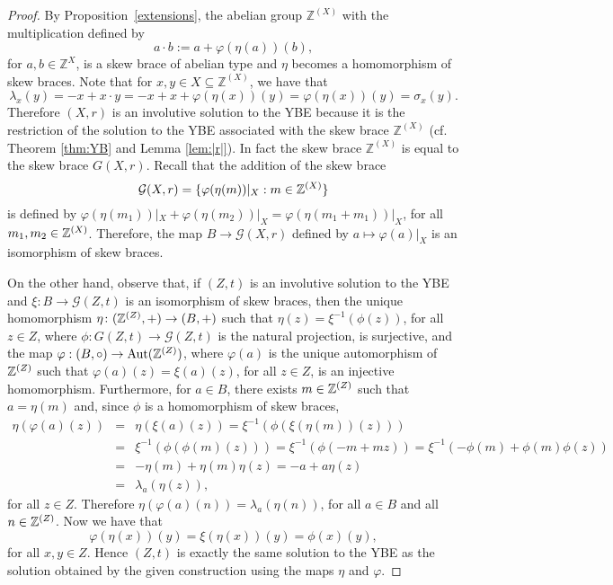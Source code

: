 \begin{proof}
	By Proposition~\ref{extensions}, the abelian group
	$\mathbb{Z}^{(X)}$ with the multiplication defined  by
	$$a\cdot b:=a+\varphi(\eta(a))(b),$$
	for $a,b\in \mathbb{Z}^{X}$, is a skew brace of abelian type and $\eta$ becomes a
	homomorphism of skew braces. Note that for $x, y\in X\subseteq
	\mathbb{Z}^{(X)}$, we have that
	$$\lambda_x(y)=-x+x\cdot y=-x+x+\varphi(\eta(x))(y)=\varphi(\eta(x))(y)=\sigma_x(y).$$
	Therefore $(X,r)$ is an involutive solution to the YBE because it is the
	restriction of the solution to the YBE associated with the 
	skew brace $\mathbb{Z}^{(X)}$ (cf. Theorem \ref{thm:YB} and Lemma \ref{lem:|r|}). In fact the
	skew brace $\mathbb{Z}^{(X)}$ is equal to the skew brace $G(X,r)$.
	Recall that the addition of the skew brace
	$$\mathcal{G}(X,r)=\{ \varphi(\eta(m))|_{X} : m\in \mathbb{Z}^{(X)}\}$$
	is defined by
	$\varphi(\eta(m_1))|_{X}+\varphi(\eta(m_2))|_{X}=\varphi(\eta(m_1+m_1))|_{X}$,
	for all $m_1,m_2\in \mathbb{Z}^{(X)}$.  Therefore, the map $B\to
	\mathcal{G}(X,r)$ defined by $a\mapsto \varphi(a)|_{X}$ is an
	isomorphism of skew braces.
	
	On the other hand, observe that, if $(Z,t)$ is an involutive solution to the YBE
	and  $\xi\colon B\to \mathcal{G}(Z,t)$ is an isomorphism
	of skew braces, then the unique homomorphism  $\eta\colon
	(\mathbb{Z}^{(Z)},+)\to (B,+)$ such that
	$\eta(z)=\xi^{-1}(\phi(z))$, for all $z\in Z$, where $\phi\colon
	G(Z,t)\to \mathcal{G}(Z,t)$ is the natural projection,
	is surjective, and the map
	$\varphi:(B,\circ)\to\operatorname{Aut}(\mathbb{Z}^{(Z)})$, where $\varphi(a)$
	is the unique automorphism of $\mathbb{Z}^{(Z)}$ such that
	$\varphi(a)(z)=\xi(a)(z)$, for all $z\in Z$, is an injective
	homomorphism. Furthermore, for $a\in B$, there exists $m\in
	\mathbb{Z}^{(Z)}$ such that $a=\eta(m)$ and,   since $\phi$
	is a homomorphism of skew braces,
	\begin{eqnarray*}
		\eta(\varphi(a)(z))&=&\eta(\xi(a)(z))=\xi^{-1}(\phi(\xi(\eta(m))(z)))\\
		&=&\xi^{-1}(\phi(\phi(m)(z)))=\xi^{-1}(\phi(-m+mz))=\xi^{-1}(-\phi(m)+\phi(m)\phi(z))\\
		&=&-\eta(m)+\eta(m)\eta(z)=-a+a\eta(z)\\
		&=&\lambda_a(\eta(z)),
	\end{eqnarray*}
	for all $z\in Z$. Therefore $\eta(\varphi(a)(n))=\lambda_a(\eta(n))$,
	for all $a\in B$ and all $n\in \mathbb{Z}^{(Z)}$. Now we have that
	$$\varphi(\eta(x))(y)=\xi(\eta(x))(y)=\phi(x)(y),$$
	for all $x,y\in Z$. Hence $(Z,t)$ is exactly the same solution to
	the YBE  as the solution obtained by the given construction using
	the maps $\eta$ and $\varphi$.
\end{proof}

